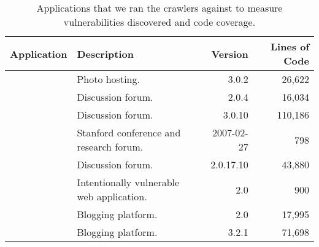 \begin{table*}[tb]
  \small
  \centering
\begin{tabular}{llrr}
\hline
 Application    &  Description &     Version  & Lines of Code \\
\hline
 \gallery{}        &  Photo hosting.  &       3.0.2  &26,622\\
 \phpbbtwo{}         &  Discussion forum.                                              &       2.0.4  &16,034\\
 \phpbbthree{}         &  Discussion forum.                                           &      3.0.10 &110,186\\
 \scarf{}          &  Stanford conference and research forum.                            &  2007-02-27  & 798 \\
 \vanillaforums{}  &  Discussion forum.           &   2.0.17.10  &43,880\\
 \wackopicko{}     &  Intentionally vulnerable web application.                          &         2.0  & 900\\
 \wordpresstwo{}     &  Blogging platform.                                     &         2.0 &17,995\\
 \wordpress{}      &  Blogging platform.                                     &       3.2.1  &71,698\\
\hline
\end{tabular}
  \caption{Applications that we ran the crawlers against to measure
    vulnerabilities discovered and code coverage.  }
\end{table*}
